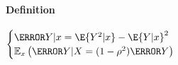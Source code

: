 \paragraph{Definition}
\begin{center}
	$\begin{cases}
	\V{Y|x}=\E{Y^{2}|x}-\E{Y|x}^{2}\\
	\mathbb{E}_{x}\left( \V{Y|X}=(1-\rho^{2})\V{Y} \right)
	\end{cases}$
\end{center}

